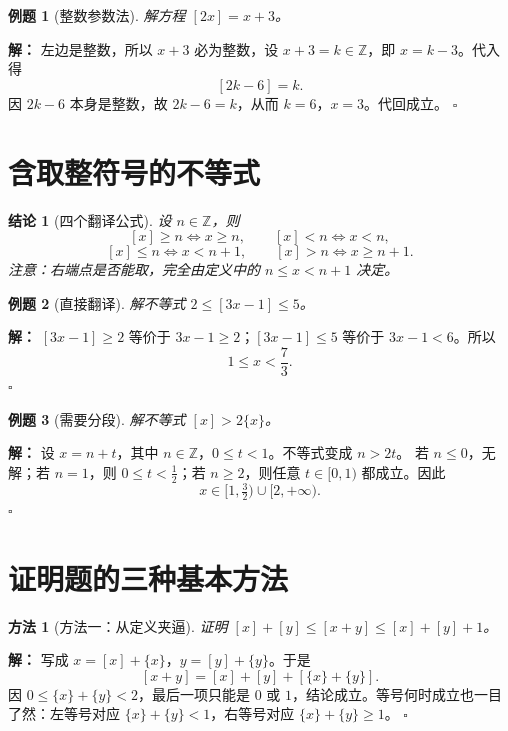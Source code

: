 \documentclass[11pt,a4paper,fontset=fandol]{ctexart}
\theoremstyle{formaltheorem}
\newtheorem{theorem}{结论}[section]
\newtheorem{method}{方法}[section]
\theoremstyle{formalexample}
\newtheorem{example}{例题}[section]
\newenvironment{solution}{\par\noindent\textbf{解：}}{\hfill$\square$\par}
\begin{document}
\begin{example}[整数参数法]
解方程 $[2x]=x+3$。
\end{example}
\begin{solution}
左边是整数，所以 $x+3$ 必为整数，设 $x+3=k\in\mathbb Z$，即 $x=k-3$。代入得
\[
[2k-6]=k.
\]
因 $2k-6$ 本身是整数，故 $2k-6=k$，从而 $k=6$，$x=3$。代回成立。
\end{solution}

\section{含取整符号的不等式}
\begin{theorem}[四个翻译公式]
设 $n\in\mathbb Z$，则
\[
[x]\ge n\iff x\ge n,\qquad [x]<n\iff x<n,
\]
\[
[x]\le n\iff x<n+1,\qquad [x]>n\iff x\ge n+1.
\]
注意：右端点是否能取，完全由定义中的 $n\le x<n+1$ 决定。
\end{theorem}

\begin{example}[直接翻译]
解不等式 $2\le[3x-1]\le5$。
\end{example}
\begin{solution}
$[3x-1]\ge2$ 等价于 $3x-1\ge2$；$[3x-1]\le5$ 等价于 $3x-1<6$。所以
\[
1\le x<\frac73.
\]
\end{solution}

\begin{example}[需要分段]
解不等式 $[x]>2\{x\}$。
\end{example}
\begin{solution}
设 $x=n+t$，其中 $n\in\mathbb Z$，$0\le t<1$。不等式变成 $n>2t$。
若 $n\le0$，无解；若 $n=1$，则 $0\le t<\tfrac12$；若 $n\ge2$，则任意 $t\in[0,1)$ 都成立。因此
\[
x\in[1,\tfrac32)\cup[2,+\infty).
\]
\end{solution}

\section{证明题的三种基本方法}
\begin{method}[方法一：从定义夹逼]
证明 $[x]+[y]\le[x+y]\le[x]+[y]+1$。
\end{method}
\begin{solution}
写成 $x=[x]+\{x\}$，$y=[y]+\{y\}$。于是
\[
[x+y]=[x]+[y]+[\{x\}+\{y\}].
\]
因 $0\le\{x\}+\{y\}<2$，最后一项只能是 $0$ 或 $1$，结论成立。等号何时成立也一目了然：左等号对应 $\{x\}+\{y\}<1$，右等号对应 $\{x\}+\{y\}\ge1$。
\end{solution}
\end{document}
